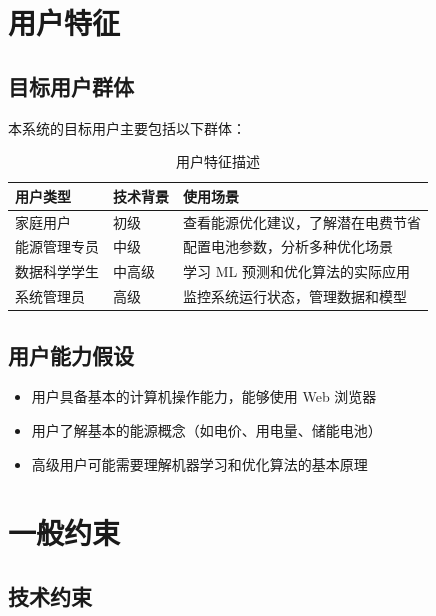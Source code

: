 \section{用户特征}

\subsection{目标用户群体}

本系统的目标用户主要包括以下群体：

\begin{table}[htbp]
    \centering
    \caption{用户特征描述}
    \label{tab:user-characteristics}
    \begin{tabularx}{\textwidth}{@{}l l X@{}}
        \toprule
        \textbf{用户类型} & \textbf{技术背景} & \textbf{使用场景}      \\
        \midrule
        家庭用户          & 初级            & 查看能源优化建议，了解潜在电费节省  \\
        能源管理专员        & 中级            & 配置电池参数，分析多种优化场景    \\
        数据科学学生        & 中高级           & 学习 ML 预测和优化算法的实际应用 \\
        系统管理员         & 高级            & 监控系统运行状态，管理数据和模型   \\
        \bottomrule
    \end{tabularx}
\end{table}

\subsection{用户能力假设}

\begin{itemize}
    \item 用户具备基本的计算机操作能力，能够使用 Web 浏览器
    \item 用户了解基本的能源概念（如电价、用电量、储能电池）
    \item 高级用户可能需要理解机器学习和优化算法的基本原理
\end{itemize}

\section{一般约束}

\subsection{技术约束}

